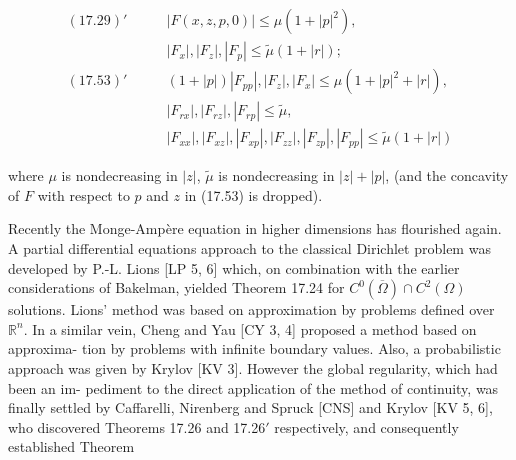 \begin{align*}
(17.29)'\qquad &|F(x, z, p, 0)| \le \mu(1 + |p|^2),\\
&|F_x|, |F_z|, |F_p| \le \tilde{\mu}(1 + |r|);\\[0.5em]
(17.53)'\qquad &(1 + |p|)|F_{pp}|, |F_z|, |F_x| \le \mu(1 + |p|^2 + |r|),\\
&|F_{rx}|, |F_{rz}|, |F_{rp}| \le \tilde{\mu},\\
&|F_{xx}|, |F_{xz}|, |F_{xp}|, |F_{zz}|, |F_{zp}|, |F_{pp}| \le \tilde{\mu}(1 + |r|)
\end{align*}

where $\mu$ is nondecreasing in $|z|$, $\tilde{\mu}$ is nondecreasing in $|z| + |p|$, (and the concavity
of $F$ with respect to $p$ and $z$ in (17.53) is dropped).

Recently the Monge-Amp\`ere equation in higher dimensions has flourished
again. A partial differential equations approach to the classical Dirichlet problem
was developed by P.-L. Lions [LP 5, 6] which, on combination with the earlier
considerations of Bakelman, yielded Theorem 17.24 for $C^0(\overline{\Omega}) \cap C^2(\Omega)$ solutions.
Lions' method was based on approximation by problems defined over $\mathbb{R}^n$. In a
similar vein, Cheng and Yau [CY 3, 4] proposed a method based on approxima-
tion by problems with infinite boundary values. Also, a probabilistic approach was
given by Krylov [KV 3]. However the global regularity, which had been an im-
pediment to the direct application of the method of continuity, was finally settled
by Caffarelli, Nirenberg and Spruck [CNS] and Krylov [KV 5, 6], who discovered
Theorems 17.26 and 17.26$'$ respectively, and consequently established Theorem


